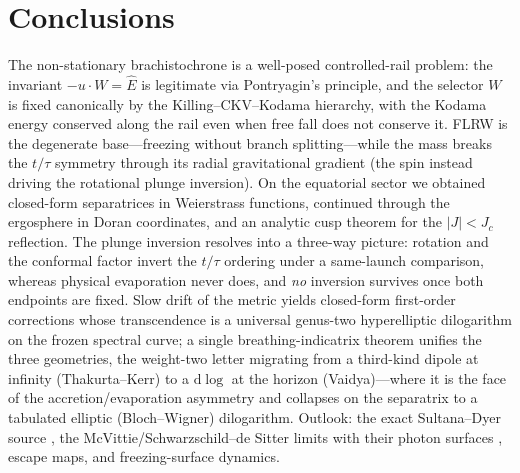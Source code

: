 \documentclass[
    aps, prd, twocolumn, superscriptaddress,
    showpacs, nofootinbib, floatfix
]{revtex4-2}
\newcommand{\Ehat}{\hat E}
\newcommand{\Jc}{J_{c}}
\newcommand{\dd}{\mathrm{d}}
\begin{document}
\section{Conclusions}
\label{sec:concl}
The non-stationary brachistochrone is a well-posed controlled-rail problem: the
invariant $-u\cdot W=\Ehat$ is legitimate via Pontryagin's principle, and the
selector $W$ is fixed canonically by the Killing--CKV--Kodama hierarchy, with
the Kodama energy conserved along the rail even when free fall does not conserve
it. FLRW is the degenerate base---freezing without branch splitting---while the
mass breaks the $t/\tau$ symmetry through its radial gravitational gradient (the
spin instead driving the rotational plunge inversion). On
the equatorial sector we obtained closed-form separatrices in Weierstrass
functions, continued through the ergosphere in Doran coordinates, and an analytic
cusp theorem for the $|J|<\Jc$ reflection. The plunge inversion resolves into a
three-way picture: rotation and the conformal factor invert the $t/\tau$
ordering under a same-launch comparison, whereas physical evaporation never does,
and \emph{no} inversion survives once both endpoints are fixed. Slow drift of the
metric yields closed-form first-order corrections whose transcendence is a
universal genus-two hyperelliptic dilogarithm on the frozen spectral curve; a
single breathing-indicatrix theorem unifies the three geometries, the weight-two
letter migrating from a third-kind dipole at infinity (Thakurta--Kerr) to a
$\dd\log$ at the horizon (Vaidya)---where it is the face of the
accretion/evaporation asymmetry and collapses on the separatrix to a tabulated
elliptic (Bloch--Wigner) dilogarithm. Outlook: the
exact Sultana--Dyer source
\cite{SultanaDyer2005}, the McVittie/Schwarzschild--de Sitter limits
\cite{McVittie1933,Kottler1918,Kaloper2010} with their photon surfaces
\cite{ClaudelViracVirbhadra2001}, escape maps, and freezing-surface dynamics.


\clearpage
\appendix
\end{document}
